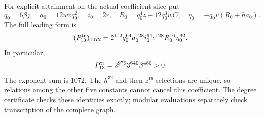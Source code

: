 For explicit attainment on the actual coefficient slice put
\[
 q_0=6\beta j,\quad a_0=12wvq_0^2,\quad i_0=2r,
 \quad R_0=q_0^4z-12q_0^3wC,\quad
 \eta_0=-q_0v(R_0+ha_0).
\]
The full leading form is
\begin{equation}
 (P_{13}^{\rm tr})_{1072}
 =2^{112}q_0^{64}a_0^{128}i_0^{64}c^{128}R_0^{16}\eta_0^{32}.
 \label{eq:trace13top}
\end{equation}
In particular,
\begin{equation}
 [j^{480}w^{160}v^{192}h^{32}r^{64}c^{128}z^{16}]
 P_{13}^{\rm tr}=2^{976}3^{640}\beta^{480}>0.
 \label{eq:trace13coefficient}
\end{equation}
The exponent sum is $1072$. The $h^{32}$ and then $z^{16}$ selections
are unique, so relations among the other five constants cannot cancel
this coefficient. The degree certificate checks these identities exactly;
modular evaluations separately check transcription of the complete graph.
